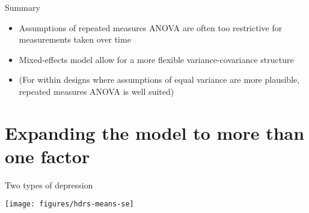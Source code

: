 \documentclass[aspectratio=169]{beamer}
\begin{document}
\begin{frame}{Summary}
  \begin{itemize}
    \item Assumptions of repeated measures ANOVA are often too restrictive
      for measurements taken over time
    \item Mixed-effects model allow for a more flexible variance-covariance
      structure
    \item (For within designs where assumptions of equal variance are more
      plausible, repeated measures ANOVA is well suited)
  \end{itemize}
  \vfill
\end{frame}

\appendix

\section{Expanding the model to more than one factor}

\begin{frame}{Two types of depression}
\begin{center}
\texttt{[image: figures/hdrs-means-se]}
\end{center}
\end{frame}
\end{document}
